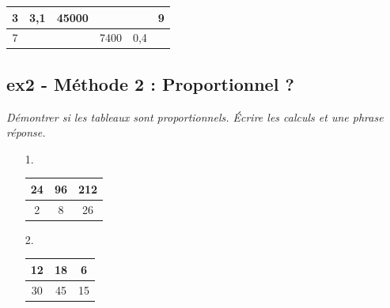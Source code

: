 \documentclass[11pt]{article}
\begin{document}
  \begin{center}
    \begin{tabular}{|c|c|c|c|c|c|}
      \hline
     3 &  3,1                   &                  45000 &  \phantom{100 000 000} &  \phantom{100 000 000} &                     9\\ \hline
     7 &  \phantom{100 000 000} &  \phantom{100 000 000} &                   7400 &                    0,4 &  \phantom{100 000 000}\\ \hline     
    \end{tabular}
  \end{center}
  \Pointilles[5]

\subsection*{ex2 - Méthode 2 : Proportionnel ?}
\textit{Démontrer si les tableaux sont proportionnels. Écrire les calculs et une phrase réponse.}

\begin{minipage}[t]{0.2\textwidth}
  \begin{enumerate}
    \item[1.]
  \begin{center}
    \begin{tabular}{|c|c|c|}
      \hline
      24 & 96 & 212 \\  \hline
      2 & 8 & 26\\  \hline
    \end{tabular}
  \end{center}
  \item[2.]
  \begin{center}
    \begin{tabular}{|c|c|c|}
      \hline
      12 & 18 & 6 \\  \hline
      30 & 45 & 15\\  \hline
    \end{tabular}
  \end{center}
\end{enumerate}
\end{minipage}
\begin{minipage}[t]{0.8\textwidth}
 
  \Pointilles[6]

\end{minipage}
\end{document}
